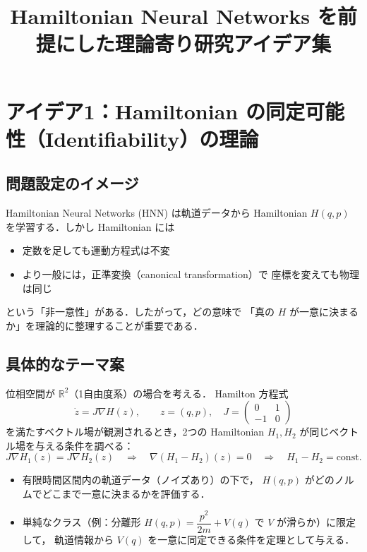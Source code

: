 \documentclass[a4paper,12pt]{jlreq}
\begin{document}
\title{Hamiltonian Neural Networks を前提にした理論寄り研究アイデア集}
\author{}
\date{}
\maketitle

\section*{アイデア1：Hamiltonian の同定可能性（Identifiability）の理論}

\subsection*{問題設定のイメージ}

Hamiltonian Neural Networks (HNN) は軌道データから Hamiltonian
\(H(q,p)\) を学習する．しかし Hamiltonian には

\begin{itemize}
  \item 定数を足しても運動方程式は不変
  \item より一般には，正準変換（canonical transformation）で
        座標を変えても物理は同じ
\end{itemize}

という「非一意性」がある．したがって，どの意味で
「真の \(H\) が一意に決まるか」を理論的に整理することが重要である．

\subsection*{具体的なテーマ案}

位相空間が \(\mathbb{R}^2\)（1自由度系）の場合を考える．
Hamilton 方程式
\[
  \dot{z} = J \nabla H(z), \qquad
  z = (q,p),\quad
  J = \begin{pmatrix} 0 & 1 \\ -1 & 0 \end{pmatrix}
\]
を満たすベクトル場が観測されるとき，2つの Hamiltonian
\(H_1, H_2\) が同じベクトル場を与える条件を調べる：
\[
  J \nabla H_1(z) = J \nabla H_2(z)
  \quad\Rightarrow\quad
  \nabla(H_1 - H_2)(z) = 0
  \quad\Rightarrow\quad
  H_1 - H_2 = \text{const}.
\]

\begin{itemize}
  \item 有限時間区間内の軌道データ（ノイズあり）の下で，
        \(H(q,p)\) がどのノルムでどこまで一意に決まるかを評価する．
  \item 単純なクラス（例：分離形
        \(H(q,p)= \dfrac{p^2}{2m} + V(q)\) で \(V\) が滑らか）に限定して，
        軌道情報から \(V(q)\) を一意に同定できる条件を定理として与える．
\end{itemize}
\end{document}
